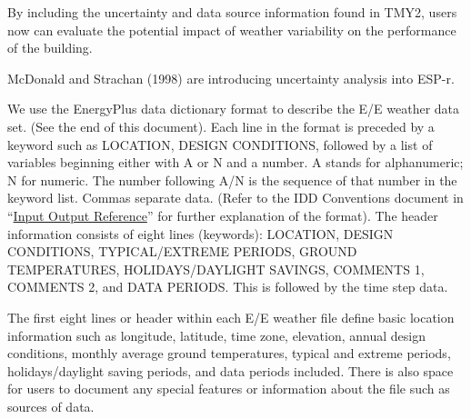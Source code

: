 By including the uncertainty and data source information found in TMY2, users now can evaluate the potential impact of weather variability on the performance of the building.

McDonald and Strachan (1998) are introducing uncertainty analysis into ESP-r.

We use the EnergyPlus data dictionary format to describe the E/E weather data set. (See the end of this document). Each line in the format is preceded by a keyword such as LOCATION, DESIGN CONDITIONS, followed by a list of variables beginning either with A or N and a number. A stands for alphanumeric; N for numeric. The number following A/N is the sequence of that number in the keyword list. Commas separate data. (Refer to the IDD Conventions document in ``\href{InputOutputReference.pdf}{Input Output Reference}'' for further explanation of the format). The header information consists of eight lines (keywords): LOCATION, DESIGN CONDITIONS, TYPICAL/EXTREME PERIODS, GROUND TEMPERATURES, HOLIDAYS/DAYLIGHT SAVINGS, COMMENTS 1, COMMENTS 2, and DATA PERIODS. This is followed by the time step data.

The first eight lines or header within each E/E weather file define basic location information such as longitude, latitude, time zone, elevation, annual design conditions, monthly average ground temperatures, typical and extreme periods, holidays/daylight saving periods, and data periods included. There is also space for users to document any special features or information about the file such as sources of data.

